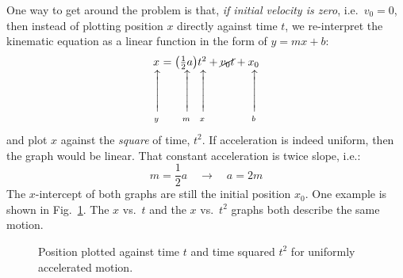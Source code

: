 \documentclass{../../../oss-handout}
\makeatletter
\newcommand\vertarrowbox[2]{%
    \begin{array}[t]{@{}c@{}} #1 \\
    \rotatebox{90}{$\xrightarrow{\hphantom{abcdefgh}}$} \\[-1ex]
    \mathclap{\scriptstyle\text{#2}}%
    \end{array}}
\makeatother
\begin{document}
One way to get around the problem is that, \emph{if initial velocity is zero},
i.e.\ $v_0=0$, then instead of plotting position $x$ directly against time $t$,
we re-interpret the kinematic equation as a linear function in the form
of $y=mx+b$:
\begin{equation}
  \vertarrowbox{x}{$y$}=\vertarrowbox{\left(\frac12 a\right)}{$m$}
  \vertarrowbox{t^2}{$x$}+
  \cancel{v_0t}+
  \vertarrowbox{x_0}{$b$}
\end{equation}
and plot $x$ against the \emph{square} of time, $t^2$. If acceleration is
indeed uniform, then the graph would be linear. That constant acceleration is
twice slope, i.e.:
\begin{equation*}
  m=\frac12 a\quad\rightarrow\quad a=2m
\end{equation*}
The $x$-intercept of both graphs are still the initial position $x_0$. One
example is shown in Fig.~\ref{switch1}. The $x$ vs.\ $t$ and the $x$ vs.\
$t^2$ graphs both describe the same motion.
\begin{figure}[!ht]
  \centering
  \hspace{.15in}
  \caption{Position plotted against time $t$ and time squared $t^2$ for
    uniformly accelerated motion.}
  \label{switch1}
\end{figure} 
\end{document}
